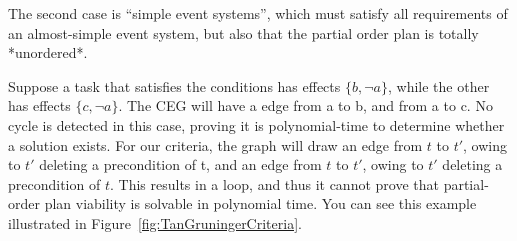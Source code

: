 The second case is \enquote{simple event systems}, which must satisfy all requirements of an almost-simple event system, but also that the partial order plan is totally *unordered*.


Suppose a task that satisfies the conditions has effects $\{b, \neg a\}$, while the other has effects $\{c, \neg a\}$. The CEG will have a edge from a to b, and from a to c. No cycle is detected in this case, proving it is polynomial-time to determine whether a solution exists. For our criteria, the graph will draw an edge from $t$ to $t'$, owing to $t'$ deleting a precondition of t, and an edge from $t$ to $t'$, owing to $t'$ deleting a precondition of $t$. This results in a loop, and thus it cannot prove that partial-order plan viability is solvable in polynomial time. You can see this example illustrated in Figure~\ref{fig:TanGruningerCriteria}. %


